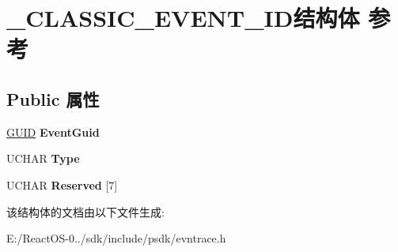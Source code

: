 \hypertarget{struct___c_l_a_s_s_i_c___e_v_e_n_t___i_d}{}\section{\+\_\+\+C\+L\+A\+S\+S\+I\+C\+\_\+\+E\+V\+E\+N\+T\+\_\+\+I\+D结构体 参考}
\label{struct___c_l_a_s_s_i_c___e_v_e_n_t___i_d}
\subsection*{Public 属性}
\begin{DoxyCompactItemize}
\item 
\mbox{\label{struct___c_l_a_s_s_i_c___e_v_e_n_t___i_d_aea7806022246bdce23f3cfe7c7e8f4c4}} 
\hyperlink{interface_g_u_i_d}{G\+U\+ID} {\bfseries Event\+Guid}
\item 
\mbox{\label{struct___c_l_a_s_s_i_c___e_v_e_n_t___i_d_a73f2b9366de98b30fd4a73447259d711}} 
U\+C\+H\+AR {\bfseries Type}
\item 
\mbox{\label{struct___c_l_a_s_s_i_c___e_v_e_n_t___i_d_ab1035ce5e6d761cd9529d5acab10f25b}} 
U\+C\+H\+AR {\bfseries Reserved} \mbox{[}7\mbox{]}
\end{DoxyCompactItemize}


该结构体的文档由以下文件生成\+:\begin{DoxyCompactItemize}
\item 
E\+:/\+React\+O\+S-\/0../sdk/include/psdk/evntrace.\+h\end{DoxyCompactItemize}

